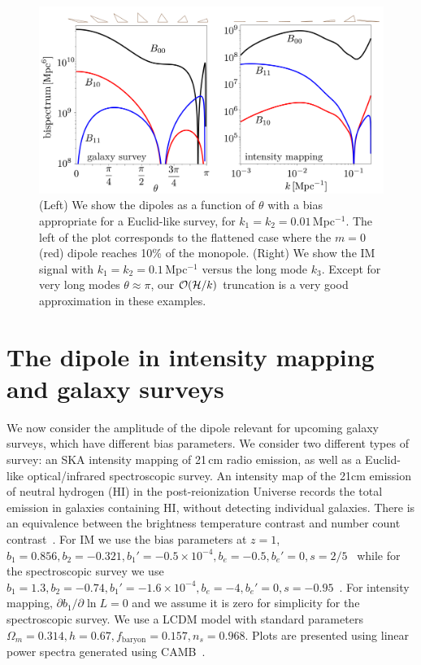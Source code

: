 \begin{figure}%
\begin{center}
\includegraphics[width=\columnwidth]{fig/figuresv2-01}
\caption{ (Left) We show the dipoles as a function of $\theta$ with a bias appropriate for a Euclid-like survey, for $k_1=k_2=0.01$\,Mpc$^{-1}$. The left of the plot corresponds to the flattened case where the $m=0$ (red) dipole reaches 10\% of the monopole.  (Right) We show the IM signal with $k_1=k_2=0.1$\,Mpc$^{-1}$ versus the long mode $k_3$. Except for very long modes $\theta\approx\pi$, our $\mathcal{O}(\mathcal{H}/k)$ truncation is a very good approximation in these examples. }
\label{sankcjnakjdcs}
\end{center}
\end{figure}
 


\section{The dipole in intensity mapping and galaxy surveys}

We now consider the amplitude of the dipole relevant for upcoming galaxy surveys, which have different bias parameters. We consider two different types of survey: an SKA intensity mapping of 21\,cm radio emission, as well as a Euclid-like optical/infrared spectroscopic survey.
An intensity map of the 21cm emission of neutral hydrogen (HI) in the post-reionization Universe records the total emission in galaxies containing HI, without detecting individual galaxies. There is an equivalence between the brightness temperature contrast and number count contrast~\citep{Umeh:2015gza}.  For IM we use the bias parameters at $z=1$, 
$b_1 = 0.856, b_2 = -0.321, b_1' = -0.5\times10^{-4}, b_e = -0.5, b_e'=0, s = 2/5$~\citep{Fonseca:2018hsu,Umeh:2015gza}
while for the spectroscopic survey we use 
$ b_1 = 1.3,b_2 = -0.74, b_1' = -1.6\times10^{-4},  b_e = -4, b_e' = 0, s = -0.95$~\citep{Camera:2018jys,Yankelevich:2018uaz}.
For intensity mapping, $ \partial b_1/\partial \ln L =0$ and we assume it is zero for simplicity for the spectroscopic survey. We use a LCDM model with standard parameters $\Omega_m=0.314, h=0.67, f_\text{baryon}=0.157, n_s=0.968$. Plots are presented using linear power spectra generated using CAMB~\citep{Lewis:1999bs}.


